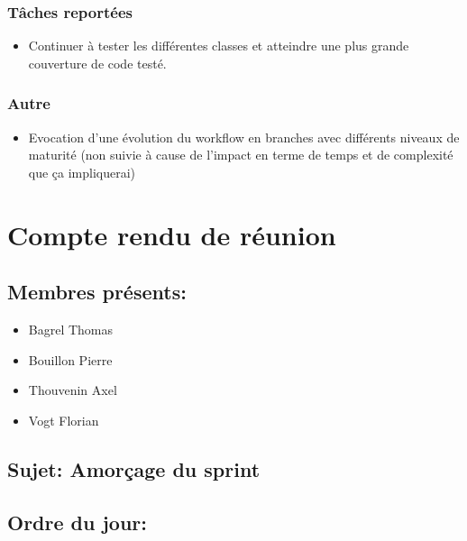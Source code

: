 \documentclass[a4paper, 12pt]{report}
\begin{document}
\subsubsection{Tâches reportées}

\begin{itemize}

\item
  Continuer à tester les différentes classes et atteindre une plus
  grande couverture de code testé.
\end{itemize}

\subsubsection{Autre}

\begin{itemize}

\item
  Evocation d'une évolution du workflow en branches avec différents
  niveaux de maturité (non suivie à cause de l'impact en terme de temps
  et de complexité que ça impliquerai)
\end{itemize}



\section{Compte rendu de réunion }

\subsection*{Membres présents:}

\begin{itemize}

\item
  Bagrel Thomas
\item
  Bouillon Pierre
\item
  Thouvenin Axel
\item
  Vogt Florian
\end{itemize}

\subsection*{Sujet: Amorçage du sprint }

\subsection*{Ordre du jour:}
\end{document}
